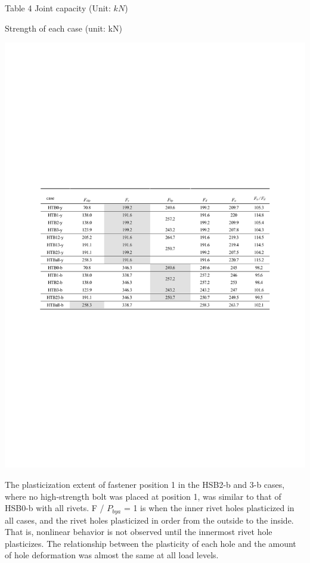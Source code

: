 Table 4 Joint capacity (Unit: $kN$)

\begin{table}
    \caption{Strength of each case (unit: kN)}
    \label{ch4tab4}
    \includegraphics[width=\textwidth]{imgs/ch4/tab4.pdf}
\end{table}

The plasticization extent of fastener position 1 in the HSB2-b and 3-b cases, where no high-strength bolt was placed at position 1, was similar to that of HSB0-b with all rivets. F / $P_{bya}$ = 1 is when the inner rivet holes plasticized in all cases, and the rivet holes plasticized in order from the outside to the inside. That is, nonlinear behavior is not observed until the innermost rivet hole plasticizes. The relationship between the plasticity of each hole and the amount of hole deformation was almost the same at all load levels.

